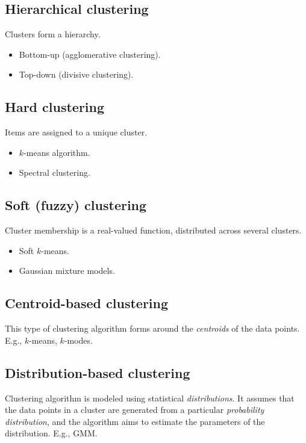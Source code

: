 \documentclass[
	number={6},
	title={Clustering}
]{cs584notes}
\begin{document}
\subsection{Hierarchical clustering}\label{subsec:hierarchical-clustering}
Clusters form a hierarchy.
\begin{itemize}
	\item Bottom-up (agglomerative clustering).
	\item Top-down (divisive clustering).
\end{itemize}

\subsection{Hard clustering}\label{subsec:hard-clustering}
Items are assigned to a unique cluster.
\begin{itemize}
	\item $k$-means algorithm.
	\item Spectral clustering.
\end{itemize}

\subsection{Soft (fuzzy) clustering}\label{subsec:soft-clustering}
Cluster membership is a real-valued function, distributed across several clusters.
\begin{itemize}
	\item Soft $k$-means.
	\item Gaussian mixture models.
\end{itemize}

\subsection{Centroid-based clustering}\label{subsec:centroid-based-clustering}
This type of clustering algorithm forms around the \emph{centroids} of the data points.
E.g., $k$-means, $k$-modes.

\subsection{Distribution-based clustering}\label{subsec:distribution-based-clustering}
Clustering algorithm is modeled using statistical \emph{distributions}.
It assumes that the data points in a cluster are generated from a particular \emph{probability distribution}, and the algorithm aims to estimate the parameters of the distribution.
E.g., GMM\@.
\end{document}
